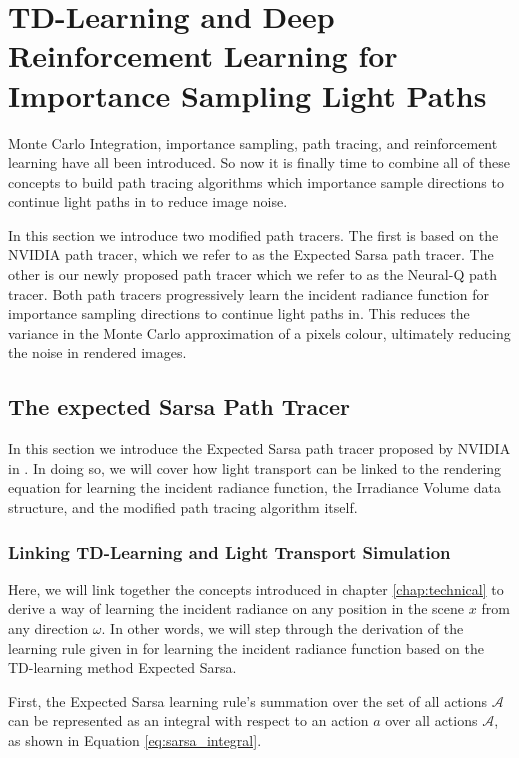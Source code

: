 \documentclass[../dissertation.tex]{subfiles}
\begin{document}
\chapter{TD-Learning and Deep Reinforcement Learning for Importance Sampling Light Paths}
\label{chap:td_deep_sampling}

Monte Carlo Integration, importance sampling, path tracing, and reinforcement learning have all been introduced. So now it is finally time to combine all of these concepts to build path tracing algorithms which importance sample directions to continue light paths in to reduce image noise.

In this section we introduce two modified path tracers. The first is based on the NVIDIA path tracer, which we refer to as the Expected Sarsa path tracer. The other is our newly proposed path tracer which we refer to as the Neural-Q path tracer. Both path tracers progressively learn the incident radiance function for importance sampling directions to continue light paths in. This reduces the variance in the Monte Carlo approximation of a pixels colour, ultimately reducing the noise in rendered images. 

\section{The expected Sarsa Path Tracer}
\label{sec:expecte_sarsa_path_tracer}

In this section we introduce the Expected Sarsa path tracer proposed by NVIDIA in \cite{dahm2017learning}. In doing so, we will cover how light transport can be linked to the rendering equation for learning the incident radiance function, the Irradiance Volume data structure, and the modified path tracing algorithm itself.

\subsection{Linking TD-Learning and Light Transport Simulation}
\label{sec:td_light_transport}
Here, we will  link together the concepts introduced in chapter \ref{chap:technical} to derive a way of learning the incident radiance on any position in the scene $x$ from any direction $\omega$. In other words, we will step through the derivation of the learning rule given in \cite{dahm2017learning} for learning the incident radiance function based on the TD-learning method Expected Sarsa.

First, the Expected Sarsa learning rule's summation over the set of all actions $\mathcal{A}$ can be represented as an integral with respect to an action $a$ over all actions $\mathcal{A}$, as shown in Equation \ref{eq:sarsa_integral}.
\end{document}
